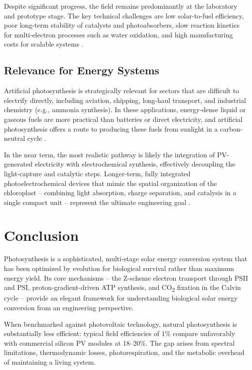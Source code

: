 \documentclass[conference]{IEEEtran}
\begin{document}
Despite significant progress, the field remains predominantly at the laboratory and prototype stage. The key technical challenges are low solar-to-fuel efficiency, poor long-term stability of catalysts and photoabsorbers, slow reaction kinetics for multi-electron processes such as water oxidation, and high manufacturing costs for scalable systems \cite{pubmed_artificial, pmc_artificial}.

\subsection{Relevance for Energy Systems}
Artificial photosynthesis is strategically relevant for sectors that are difficult to electrify directly, including aviation, shipping, long-haul transport, and industrial chemistry (e.g., ammonia synthesis). In these applications, energy-dense liquid or gaseous fuels are more practical than batteries or direct electricity, and artificial photosynthesis offers a route to producing these fuels from sunlight in a carbon-neutral cycle \cite{pubs_aip, pubmed_comparison}.

In the near term, the most realistic pathway is likely the integration of PV-generated electricity with electrochemical synthesis, effectively decoupling the light-capture and catalytic steps. Longer-term, fully integrated photoelectrochemical devices that mimic the spatial organization of the chloroplast -- combining light absorption, charge separation, and catalysis in a single compact unit -- represent the ultimate engineering goal \cite{pmc_artificial, satw_outlook}.

\section{Conclusion}

Photosynthesis is a sophisticated, multi-stage solar energy conversion system that has been optimized by evolution for biological survival rather than maximum energy yield. Its core mechanisms -- the Z-scheme electron transport through PSII and PSI, proton-gradient-driven ATP synthesis, and CO\textsubscript{2} fixation in the Calvin cycle -- provide an elegant framework for understanding biological solar energy conversion from an engineering perspective.

When benchmarked against photovoltaic technology, natural photosynthesis is substantially less efficient: typical field efficiencies of 1\% compare unfavorably with commercial silicon PV modules at 18--20\%. The gap arises from spectral limitations, thermodynamic losses, photorespiration, and the metabolic overhead of maintaining a living system.
\end{document}
